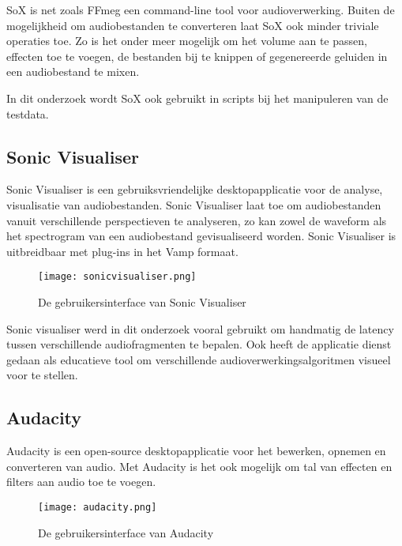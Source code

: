 SoX is net zoals FFmeg een command-line tool voor audioverwerking. Buiten de mogelijkheid om audiobestanden te converteren laat SoX ook minder triviale operaties toe. Zo is het onder meer mogelijk om het volume aan te passen, effecten toe te voegen, de bestanden bij te knippen of gegenereerde geluiden in een audiobestand te mixen.
\cite{barras2012sox}

In dit onderzoek wordt SoX ook gebruikt in scripts bij het manipuleren van de testdata.

\subsection{Sonic Visualiser}

Sonic Visualiser is een gebruiksvriendelijke desktopapplicatie voor de analyse, visualisatie van audiobestanden. Sonic Visualiser laat toe om audiobestanden vanuit verschillende perspectieven te analyseren, zo kan zowel de waveform als het spectrogram van een audiobestand gevisualiseerd worden. Sonic Visualiser is uitbreidbaar met plug-ins in het Vamp formaat. \cite{cannam2010sonic}

\vspace{1cm}
\begin{figure}[!h]
	\captionsetup{width=0.8\textwidth}
	\caption[Gebruikersinterface van Sonic Visualiser]{De gebruikersinterface van Sonic Visualiser}
	\advance\parskip0.3cm
	\centering
	\texttt{[image: sonicvisualiser.png]}
\end{figure}

Sonic visualiser werd in dit onderzoek vooral gebruikt om handmatig de latency tussen verschillende audiofragmenten te bepalen. Ook heeft de applicatie dienst gedaan als educatieve tool om verschillende audioverwerkingsalgoritmen visueel voor te stellen.
\vspace{0.5cm}

\subsection{Audacity}

Audacity is een open-source desktopapplicatie voor het bewerken, opnemen en converteren van audio. Met Audacity is het ook mogelijk om tal van effecten en filters aan audio toe te voegen.\cite{audacity2016}

\vspace{1cm}
\begin{figure}[!h]
	\captionsetup{width=0.8\textwidth}
	\caption[Gebruikersinterface van Audacity]{De gebruikersinterface van Audacity}
	\centering
	\advance\parskip0.3cm
	\texttt{[image: audacity.png]}
\end{figure}
\vspace{0.5cm}

